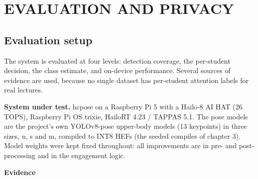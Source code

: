 \chapter{EVALUATION AND PRIVACY}

\section{Evaluation setup}

The system is evaluated at four levels: detection coverage, the per-student decision, the class estimate, and on-device performance. Several sources of evidence are used, because no single dataset has per-student attention labels for real lectures.

\textbf{System under test.} hcpose on a Raspberry Pi 5 with a Hailo-8 AI HAT (26 TOPS), Raspberry Pi OS trixie, HailoRT 4.23 / TAPPAS 5.1. The pose models are the project's own YOLOv8-pose upper-body models (13 keypoints) in three sizes, n, s and m, compiled to INT8 HEFs (the seeded compiles of chapter 3). Model weights were kept fixed throughout: all improvements are in pre- and post-processing and in the engagement logic.

\textbf{Evidence}

